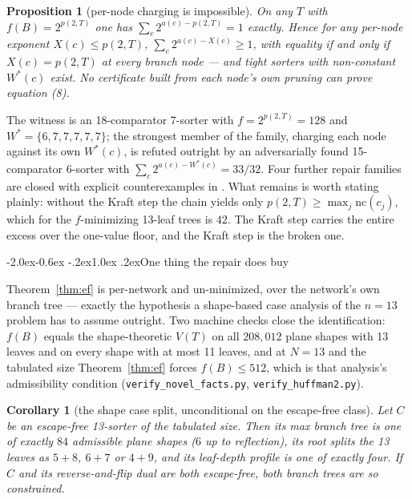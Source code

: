\documentclass[11pt,a4paper]{article}
\makeatletter
\renewcommand\subsection{\@startsection{subsection}{2}{\z@}%
  {-2.0ex\@plus -0.6ex \@minus -.2ex}{1.0ex \@plus .2ex}{\normalfont\normalsize\bfseries}}
\newtheorem{proposition}[statement]{Proposition}
\newtheorem{corollary}[statement]{Corollary}
\newcommand{\nc}{\mathrm{nc}}
\makeatother
\begin{document}
\begin{proposition}[per-node charging is impossible]
\label{prop:pernode}
On any $T$ with $f(B) = 2^{p(2,T)}$ one has $\sum_c 2^{a(c)-p(2,T)} = 1$
exactly. Hence for any per-node exponent $X(c) \le p(2,T)$,
$\sum_c 2^{a(c)-X(c)} \ge 1$, with equality if and only if $X(c) = p(2,T)$ at
every branch node --- and tight sorters with non-constant $W^*(c)$ exist. No
certificate built from each node's own pruning can prove equation (8).
\end{proposition}

The witness is an 18-comparator 7-sorter with $f = 2^{p(2,T)} = 128$ and
$W^* = \{6,7,7,7,7,7\}$; the strongest member of the family, charging each node
against its own $W^*(c)$, is refuted outright by an adversarially found
15-comparator 6-sorter with $\sum_c 2^{a(c)-W^*(c)} = 33/32$. Four further
repair families are closed with explicit counterexamples in \cite{Art}. What
remains is worth stating plainly: without the Kraft step the chain yields only
$p(2,T) \ge \max_j \nc(c_j)$, which for the $f$-minimizing 13-leaf trees is
$42$. The Kraft step carries the entire excess over the one-value floor, and the
Kraft step is the broken one.

\subsection{One thing the repair does buy}

Theorem~\ref{thm:ef} is per-network and un-minimized, over the network's own
branch tree --- exactly the hypothesis a shape-based case analysis of the
$n = 13$ problem has to assume outright. Two machine checks close the
identification: $f(B)$ equals the shape-theoretic $V(T)$ on all $208{,}012$
plane shapes with 13 leaves and on every shape with at most 11 leaves, and at
$N = 13$ and the tabulated size Theorem~\ref{thm:ef} forces $f(B) \le 512$,
which is that analysis's admissibility condition
(\texttt{verify\_novel\_facts.py}, \texttt{verify\_huffman2.py}).

\begin{corollary}[the shape case split, unconditional on the escape-free class]
\label{cor:shapes}
Let $C$ be an escape-free 13-sorter of the tabulated size. Then its max branch
tree is one of exactly $84$ admissible plane shapes ($6$ up to reflection), its
root splits the 13 leaves as $5+8$, $6+7$ or $4+9$, and its leaf-depth profile
is one of exactly four. If $C$ and its reverse-and-flip dual are both
escape-free, both branch trees are so constrained.
\end{corollary}
\end{document}
